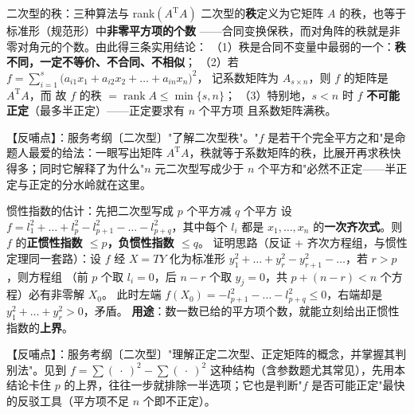 \begin{fdeep}{二次型的秩：三种算法与 rank$(A^{\mathrm T}A)$}
二次型的\textbf{秩}定义为它矩阵 $A$ 的秩，也等于标准形（规范形）中\textbf{非零平方项的个数}
——合同变换保秩，而对角阵的秩就是非零对角元的个数。由此得三条实用结论：
（1）秩是合同不变量中最弱的一个：\textbf{秩不同，一定不等价、不合同、不相似}；
（2）若 $f=\sum_{i=1}^{s}\bigl(a_{i1}x_1+a_{i2}x_2+\dots+a_{in}x_n\bigr)^{2}$，
记系数矩阵为 $A_{s\times n}$，则 $f$ 的矩阵是 $A^{\mathrm T}A$，而
故 $f$ 的秩 $=\operatorname{rank}A\le\min\{s,n\}$；
（3）特别地，$s<n$ 时 $f$ \textbf{不可能正定}（最多半正定）——正定要求有 $n$ 个平方项
且系数矩阵满秩。

【反哺点】：服务考纲〔二次型〕"了解二次型秩"。"$f$ 是若干个完全平方之和"是命题人最爱的给法：一眼写出矩阵 $A^{\mathrm T}A$，秩就等于系数矩阵的秩，比展开再求秩快得多；同时它解释了为什么"$n$ 元二次型写成少于 $n$ 个平方和"必然不正定——半正定与正定的分水岭就在这里。
\end{fdeep}

\begin{fdeep}{惯性指数的估计：先把二次型写成 $p$ 个平方减 $q$ 个平方}
设 $f=l_1^{2}+\dots+l_p^{2}-l_{p+1}^{2}-\dots-l_{p+q}^{2}$，其中每个 $l_i$ 都是
$x_1,\dots,x_n$ 的\textbf{一次齐次式}。则 $f$ 的\textbf{正惯性指数 $\le p$，负惯性指数 $\le q$}。
证明思路（反证 + 齐次方程组，与惯性定理同一套路）：设 $f$ 经 $X=TY$ 化为标准形
$y_1^{2}+\dots+y_r^{2}-y_{r+1}^{2}-\dots$，若 $r>p$，则方程组
（前 $p$ 个取 $l_i=0$，后 $n-r$ 个取 $y_j=0$，共 $p+(n-r)<n$ 个方程）必有非零解 $X_0$。
此时左端 $f(X_0)=-l_{p+1}^{2}-\dots-l_{p+q}^{2}\le0$，右端却是 $y_1^{2}+\dots+y_r^{2}>0$，矛盾。
\textbf{用途}：数一数已给的平方项个数，就能立刻给出正惯性指数的\textbf{上界}。

【反哺点】：服务考纲〔二次型〕"理解正定二次型、正定矩阵的概念，并掌握其判别法"。见到 $f=\sum(\ \cdot\ )^{2}-\sum(\ \cdot\ )^{2}$ 这种结构（含参数题尤其常见），先用本结论卡住 $p$ 的上界，往往一步就排除一半选项；它也是判断"$f$ 是否可能正定"最快的反驳工具（平方项不足 $n$ 个即不正定）。
\end{fdeep}

